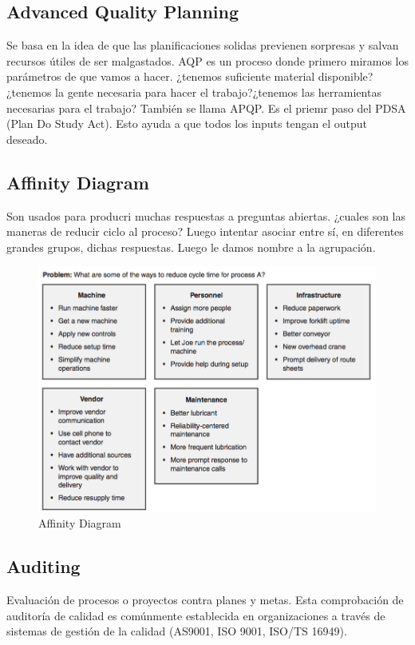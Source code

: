 \documentclass[]{article}
\begin{document}
\subsection{Advanced Quality Planning} 

Se basa en la idea de que las planificaciones solidas previenen sorpresas y salvan recursos útiles de ser malgastados. AQP es un proceso donde primero miramos los parámetros de que vamos a hacer. ¿tenemos suficiente material disponible? ¿tenemos la gente necesaria para hacer el trabajo?¿tenemos las herramientas necesarias para el trabajo? También se llama APQP. 
Es el priemr paso del PDSA (Plan Do Study Act). Esto ayuda a que todos los inputs tengan el output deseado.

\subsection{Affinity Diagram}

Son usados para producri muchas respuestas a preguntas abiertas. ¿cuales son las maneras de reducir ciclo al proceso? Luego intentar asociar entre sí, en diferentes grandes grupos, dichas respuestas. Luego le damos nombre a la agrupación.

\begin{figure}[ht!]
	\centering
	\includegraphics[width=120mm]{imagenes/AffinityDiagram.png}
	\caption{Affinity Diagram}
	\label{fig:AffinityDiagram}
\end{figure}

\subsection{Auditing}

Evaluación de procesos o proyectos contra planes y metas. Esta comprobación de auditoría de calidad es comúnmente establecida en organizaciones a través de sistemas de gestión de la calidad (AS9001, ISO 9001, ISO/TS 16949).
\end{document}
